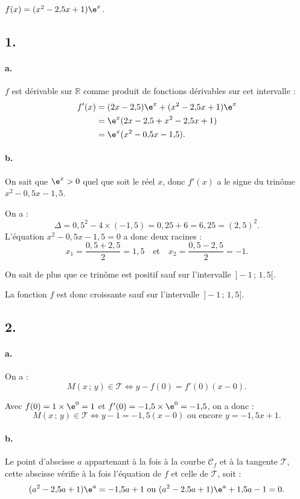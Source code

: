 \( f(x) = (x^2 - 2{,}5x + 1) \e^x \).

\subsection*{1.}

\paragraph{a.} \(f\) est dérivable sur \( \mathbb{R} \) comme produit de fonctions dérivables sur cet intervalle :
\begin{align*}
f'(x) &= (2x - 2{,}5) \e^x + (x^2 - 2{,}5x + 1) \e^x \\
&= \e^x (2x - 2{,}5 + x^2 - 2{,}5x + 1) \\
&= \e^x (x^2 - 0{,}5x - 1{,}5).
\end{align*}

\paragraph{b.} On sait que \( \e^x > 0 \) quel que soit le réel \( x \), donc \( f'(x) \) a le signe du trinôme \( x^2 - 0{,}5x - 1{,}5 \).

On a :
\[
\Delta = 0{,}5^2 - 4 \times (-1{,}5) = 0{,}25 + 6 = 6{,}25 = (2{,}5)^2.
\]
L'équation \( x^2 - 0{,}5x - 1{,}5 = 0 \) a donc deux racines :
\[
x_1 = \dfrac{0{,}5 + 2{,}5}{2} = 1{,}5 \quad \text{et} \quad x_2 = \dfrac{0{,}5 - 2{,}5}{2} = -1.
\]

On sait de plus que ce trinôme est positif sauf sur l'intervalle \( \,] -1 \,;\, 1{,}5[ \).

La fonction \(f\) est donc croissante sauf sur l'intervalle \( \,] -1 \,;\, 1{,}5[ \).

\subsection*{2.}

\paragraph{a.} On a :
\[
M(x \,;\, y) \in \mathcal{T} \iff y - f(0) = f'(0)(x - 0).
\]

Avec \(f(0) = 1 \times \e^0 = 1\) et \(f'(0) = -1{,}5 \times \e^0 = -1{,}5\), on a donc :
\[
M(x \,;\, y) \in \mathcal{T} \iff y - 1 = -1{,}5(x - 0) \text{ ou encore } y = -1{,}5x + 1.
\]

\paragraph{b.} Le point d'abscisse \(a\) appartenant à la fois à la courbe \(\mathcal{C}_f\) et à la tangente \(\mathcal{T}\), cette abscisse vérifie à la fois l'équation de \(f\) et celle de \(\mathcal{T}\), soit :
\[
(a^2 - 2{,}5a + 1) \e^a = -1{,}5a + 1 \text{ ou } (a^2 - 2{,}5a + 1) \e^a + 1{,}5a - 1 = 0.
\]

